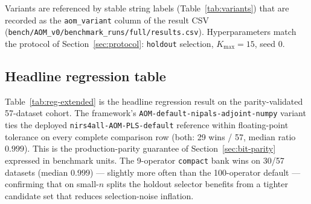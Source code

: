 \documentclass[review,a4paper]{elsarticle}
\newcommand{\PLS}{\textsc{PLS}\xspace}
\begin{document}
Variants are referenced by stable string labels (Table~\ref{tab:variants})
that are recorded as the \verb|aom_variant| column of the result CSV
(\verb|bench/AOM_v0/benchmark_runs/full/results.csv|). Hyperparameters
match the protocol of Section~\ref{sec:protocol}: \texttt{holdout}
selection, $K_\text{max}{=}15$, seed $0$.

\subsection{Headline regression table}

\begin{table}[t]
\centering
\caption{Regression benchmark across the 57-dataset cohort
(criterion=\textsc{holdout} unless noted, $K_\text{max}=15$, seed=0).
\emph{Wins / N} counts datasets on which the variant strictly beats
\PLS-standard. \emph{Median RMSEP / PLS} is the per-dataset RMSEP
normalised by \PLS-standard then aggregated by median across datasets;
values below~1 indicate a win against standard \PLS. The
\texttt{nirs4all-AOM-PLS} row is the deployed reference, not a
competitor of the framework rows: the framework's
\texttt{AOM-default-nipals-adjoint} row reproduces its $b^\star$ and
$k^\star$ on the parity cohort and matches its cohort RMSEPs within
floating-point tolerance (Section~\ref{sec:bit-parity}; max absolute
prediction divergence $4.37\times10^{-11}$ in the parity test).
Generated from \texttt{publication/tables/relative\_rmsep\_per\_variant.csv}.}
\label{tab:reg-extended}

\end{table}

\begin{table}[t]
\centering
\caption{Per-variant absolute RMSEP statistics across the cohort.
Mean RMSEP is dominated by a small number of large-magnitude datasets
(MALARIA in particular) and should be read alongside the median.
Generated from \texttt{publication/tables/summary\_per\_variant.csv}.}
\label{tab:reg-main}

\end{table}

Table~\ref{tab:reg-extended} is the headline regression result on the
parity-validated 57-dataset cohort. The framework's
\verb|AOM-default-nipals-adjoint-numpy| variant ties the deployed
\verb|nirs4all-AOM-PLS-default| reference within floating-point
tolerance on every complete comparison row (both: 29 wins / 57,
median ratio $0.999$). This is the production-parity guarantee of
Section~\ref{sec:bit-parity} expressed in benchmark units. The
9-operator \texttt{compact} bank wins on 30/57
datasets (median $0.999$) — slightly more often than the 100-operator
default — confirming that on small-$n$ splits the holdout selector
benefits from a tighter candidate set that reduces selection-noise
inflation.
\end{document}
